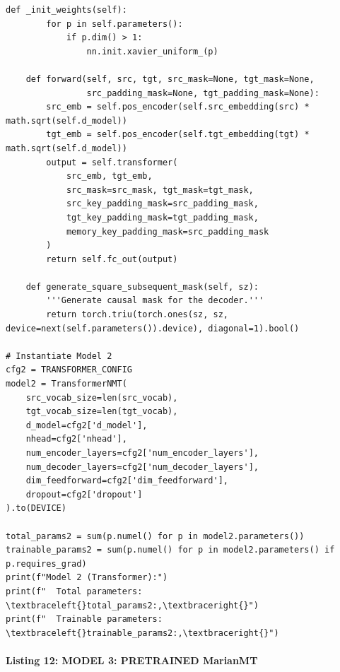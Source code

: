 \documentclass[12pt,a4paper,oneside]{report}
\begin{document}
\begin{Verbatim}[commandchars=\\\{\},breaklines=true,breakanywhere=true,fontsize=\scriptsize,frame=leftline,framesep=2mm,rulecolor=\color{gray}]
    def _init_weights(self):
        for p in self.parameters():
            if p.dim() > 1:
                nn.init.xavier_uniform_(p)

    def forward(self, src, tgt, src_mask=None, tgt_mask=None,
                src_padding_mask=None, tgt_padding_mask=None):
        src_emb = self.pos_encoder(self.src_embedding(src) * math.sqrt(self.d_model))
        tgt_emb = self.pos_encoder(self.tgt_embedding(tgt) * math.sqrt(self.d_model))
        output = self.transformer(
            src_emb, tgt_emb,
            src_mask=src_mask, tgt_mask=tgt_mask,
            src_key_padding_mask=src_padding_mask,
            tgt_key_padding_mask=tgt_padding_mask,
            memory_key_padding_mask=src_padding_mask
        )
        return self.fc_out(output)

    def generate_square_subsequent_mask(self, sz):
        '''Generate causal mask for the decoder.'''
        return torch.triu(torch.ones(sz, sz, device=next(self.parameters()).device), diagonal=1).bool()

# Instantiate Model 2
cfg2 = TRANSFORMER_CONFIG
model2 = TransformerNMT(
    src_vocab_size=len(src_vocab),
    tgt_vocab_size=len(tgt_vocab),
    d_model=cfg2['d_model'],
    nhead=cfg2['nhead'],
    num_encoder_layers=cfg2['num_encoder_layers'],
    num_decoder_layers=cfg2['num_decoder_layers'],
    dim_feedforward=cfg2['dim_feedforward'],
    dropout=cfg2['dropout']
).to(DEVICE)

total_params2 = sum(p.numel() for p in model2.parameters())
trainable_params2 = sum(p.numel() for p in model2.parameters() if p.requires_grad)
print(f"Model 2 (Transformer):")
print(f"  Total parameters: \textbraceleft{}total_params2:,\textbraceright{}")
print(f"  Trainable parameters: \textbraceleft{}trainable_params2:,\textbraceright{}")
\end{Verbatim}
\paragraph{Listing 12: MODEL 3: PRETRAINED MarianMT}\mbox{}\\[-1ex]
\end{document}
